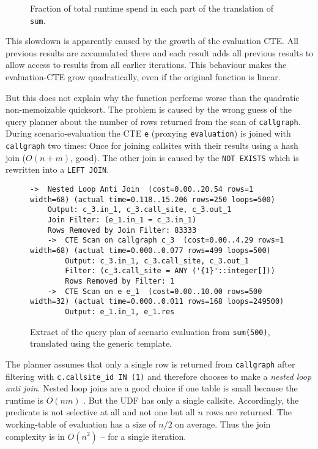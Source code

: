 \begin{figure}[h!]
    \centering\small
    
    \caption{Fraction of total runtime spend in each part of the translation of \texttt{sum}.}
    \label{fig:split_sr_times}
\end{figure}

This slowdown is apparently caused by the growth of the evaluation CTE. All previous results are accumulated there and each result adds all previous results to allow access to results from all earlier iterations. This behaviour makes the evaluation-CTE grow quadratically, even if the original function is linear.

But this does not explain why the function performs worse than the quadratic non-memoizable quicksort. The problem is caused by the wrong guess of the query planner about the number of rows returned from the scan of \texttt{callgraph}. During scenario-evaluation the CTE \texttt{e} (proxying \texttt{evaluation}) is joined with \texttt{callgraph} two times: Once for joining callsites with their results using a hash join ($O(n+m)$, good). The other join is caused by the \texttt{NOT EXISTS} which is rewritten into a \texttt{LEFT JOIN}.

\begin{figure}[h!]
    \centering\scriptsize
    \begin{verbatim}
->  Nested Loop Anti Join  (cost=0.00..20.54 rows=1 width=68) (actual time=0.118..15.206 rows=250 loops=500)
	Output: c_3.in_1, c_3.call_site, c_3.out_1
	Join Filter: (e_1.in_1 = c_3.in_1)
	Rows Removed by Join Filter: 83333
	->  CTE Scan on callgraph c_3  (cost=0.00..4.29 rows=1 width=68) (actual time=0.000..0.077 rows=499 loops=500)
	    Output: c_3.in_1, c_3.call_site, c_3.out_1
	    Filter: (c_3.call_site = ANY ('{1}'::integer[]))
	    Rows Removed by Filter: 1
	->  CTE Scan on e e_1  (cost=0.00..10.00 rows=500 width=32) (actual time=0.000..0.011 rows=168 loops=249500)
	    Output: e_1.in_1, e_1.res
    \end{verbatim}
    \caption{Extract of the query plan of scenario evaluation from \texttt{sum(500)}, translated using the generic template.}
    \label{plan:sum}
\end{figure}

The planner assumes that only a single row is returned from \texttt{callgraph} after filtering with \texttt{c.callsite\_id IN (1)} and therefore chooses to make a \textit{nested loop anti join}. Nested loop joins are a good choice if one table is small because the runtime is $O(nm)$ \cite{???}. But the UDF has only a single callsite. Accordingly, the predicate is not selective at all and not one but all $n$ rows are returned. The working-table of evaluation has a size of $n/2$ on average. Thus the join complexity is in $O(n^2)$ -- for a single iteration. 

